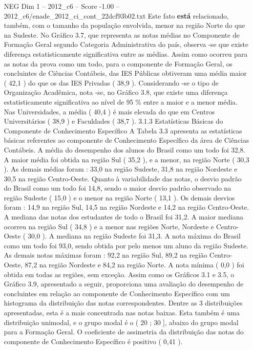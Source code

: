 \begin{textsample}{NEG Dim 1 – 2012\_c6 – Score -1.00 – 2012\_c6/enade\_2012\_ci\_cont\_22dcf93b02.txt}
Este fato \textbf{está} relacionado, também, com o tamanho da população envolvida, menor na região Norte do que na Sudeste.
No Gráfico 3.7, que representa as notas médias no Componente de Formação Geral segundo Categoria Administrativa do país, observa -se que existe diferença estatisticamente significativa entre as médias.
Assim como ocorreu para as notas da prova como um todo, para o componente de Formação Geral, os concluintes de Ciências Contábeis, das IES Públicas obtiveram uma média maior ( 42,1 ) do que os das IES Privadas ( 38,9 ).
Considerando -se o tipo de Organização Acadêmica, nota -se, no Gráfico 3.8, que existe uma diferença estatisticamente significativa ao nível de 95 \% entre a maior e a menor média.
Nas Universidades, a média ( 40,4 ) é mais elevada do que em Centros Universitários ( 38,9 ) e Faculdades ( 38,7 ). 3.1.3 Estatísticas Básicas do Componente de Conhecimento Específico A Tabela 3.3 apresenta as estatísticas básicas referentes ao componente de Conhecimento Específico da área de Ciências Contábeis.
A média do desempenho dos alunos do Brasil como um todo foi 32,8.
A maior média foi obtida na região Sul ( 35,2 ), e a menor, na região Norte ( 30,3 ).
As demais médias foram : 33,0 na região Sudeste, 31,8 na região Nordeste e 30,5 na região Centro-Oeste.
Quanto à variabilidade das notas, o desvio padrão do Brasil como um todo foi 14,8, sendo o maior desvio padrão observado na região Sudeste ( 15,0 ) e o menor na região Norte ( 13,1 ).
Os demais desvios foram : 14,9 na região Sul, 14,5 na região Nordeste e 14,2 na região Centro-Oeste.
A mediana das notas dos estudantes de todo o Brasil foi 31,2.
A maior mediana ocorreu na região Sul ( 34,8 ) e a menor nas regiões Norte, Nordeste e Centro-Oeste ( 30,0 ).
A mediana na região Sudeste foi 31,3.
A nota máxima do Brasil como um todo foi 93,0, sendo obtida por pelo menos um aluno da região Sudeste.
As demais notas máximas foram : 92,2 na região Sul, 89,2 na região Centro-Oeste, 87,2 na região Nordeste e 84,2 na região Norte.
A nota mínima ( 0,0 ) foi obtida em todas as regiões, sem exceção.
Assim como os Gráficos 3.1 e 3.5, o Gráfico 3.9, apresentado a seguir, proporciona uma avaliação do desempenho de concluintes em relação ao componente de Conhecimento Específico com um histograma da distribuição das notas correspondentes.
Dentre as 3 distribuições apresentadas, esta é a mais concentrada nas notas baixas.
Esta também é uma distribuição unimodal, e o grupo modal é o ( 20 ; 30 ], abaixo do grupo modal para a Formação Geral.
O coeficiente de assimetria da distribuição das notas do componente de Conhecimento Específico é positivo ( 0,41 ).

\end{textsample}
